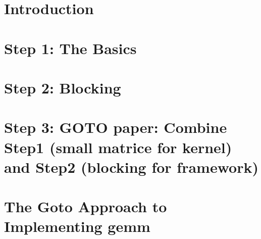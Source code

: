\section{Introduction}
\label{sec:introduction}



\section{Step 1: The Basics}



\section{Step 2: Blocking}



\section{Step 3: GOTO paper: Combine Step1 (small matrice for kernel) and Step2 (blocking for framework)}



\section{The Goto Approach to Implementing {\sc gemm}}
\label{sec:BLIS}

